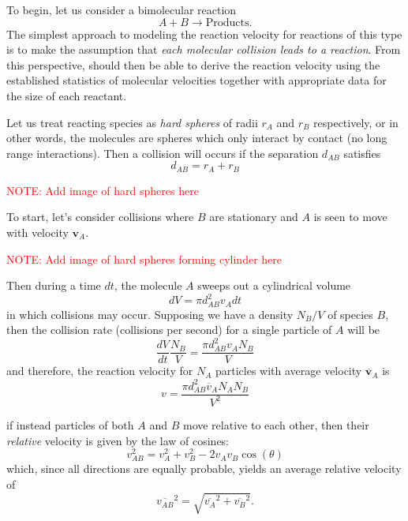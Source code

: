 To begin, let us consider a bimolecular reaction
\begin{equation}
  A + B \longrightarrow \text{Products}.
\end{equation}
The simplest approach to modeling the reaction velocity for reactions of this type is to make the assumption that \textit{each molecular collision leads to a reaction}. From this perspective, should then be able to derive the reaction velocity using the established statistics of molecular velocities together with appropriate data for the size of each reactant.

Let us treat reacting species as \textit{hard spheres} of radii $r_{A}$ and $r_{B}$ respectively, or in other words, the molecules are spheres which only interact by contact (no long range interactions). Then a collision will occurs if the separation $d_{AB}$ satisfies
\begin{equation}
  d_{AB} = r_{A} + r_{B}
\end{equation}

\textcolor{red}{NOTE: Add image of hard spheres here}

To start, let's consider collisions where $B$ are stationary and $A$ is seen to move with velocity $\mathbf{v}_{A}$.

\textcolor{red}{NOTE: Add image of hard spheres forming cylinder here}

Then during a time $dt$, the molecule $A$ sweeps out a cylindrical volume
\begin{equation}
  dV = \pi d_{AB}^2 v_{A}dt
\end{equation}
in which collisions may occur. Supposing we have a density $N_{B}/V$ of species $B$, then the collision rate (collisions per second) for a single particle of $A$ will be
\begin{equation}
  \frac{dV}{dt}\frac{N_{B}}{V} = \frac{\pi d_{AB}^2 v_{A}N_{B}}{V}
\end{equation}
and therefore, the reaction velocity for $N_{A}$ particles with average velocity $\overline{\mathbf{v}}_{A}$ is
\begin{equation}
  v = \frac{\pi d_{AB}^2 \overline{v}_{A}N_AN_B}{V^2}
\end{equation}

if instead particles of both $A$ and $B$ move relative to each other, then their \textit{relative} velocity is given by the law of cosines:
\begin{equation}
  v_{AB}^2 = v_{A}^2 + v_{B}^2 - 2v_{A}v_{B}\cos(\theta)
\end{equation}
which, since all directions are equally probable, yields an average relative velocity of
\begin{equation}
  \overline{v_{AB}}^2 = \sqrt{\overline{v_{A}}^2 + \overline{v_{B}}^2}.
\end{equation}


